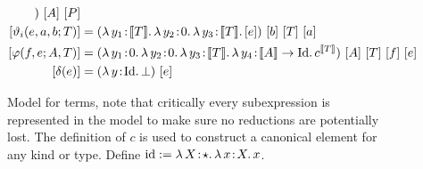 \begin{figure}
\begin{align*}
{{                }
            })\ [A]\ [P] \\
        [\vartheta_i(e, a, b; T)] &= (\abs{\lambda}{y_1}{\sema{T}}{
            \abs{\lambda}{y_2}{0} {
                \abs{\lambda}{y_3}{\sema{T}}{
                    [e]
                }
            }
        })\ [b]\ [T]\ [a] \\
        [\varphi(f, e; A, T)] &= (\abs{\lambda}{y_1}{0}{
            \abs{\lambda}{y_2}{0}{
                \abs{\lambda}{y_3}{\sema{T}}{
                    \abs{\lambda}{y_4}{\sema{A} \to \fpId}{
                        c^{\sema{T}}
                    }
                }
            }
        })\ [A]\ [T]\ [f]\ [e] \\
        [\delta(e)] &= (\abs{\lambda}{y}{\fpId}{
            \bot
        })\ [e]
    \end{align*}
    \caption{
        Model for terms, note that critically every subexpression is represented in the model to make sure no reductions are potentially lost.
        The definition of $c$ is used to construct a canonical element for any kind or type.
        Define $\text{id} := {\lambda}\, X\! : \! \star.\, 
            {\lambda}\, x\! : \! X.\, x
       $.
    }
    \label{fig:3:model_terms}
\end{figure}
